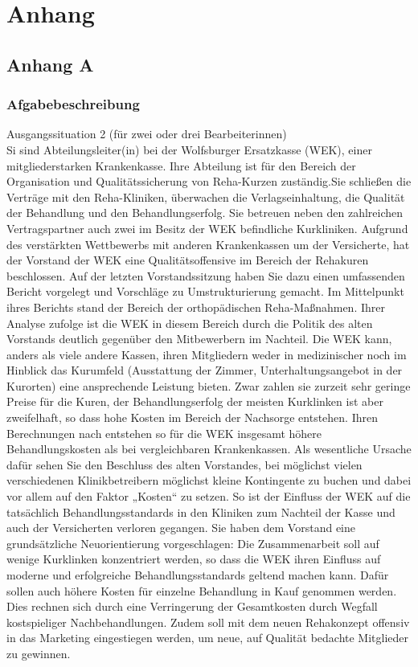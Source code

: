 \chapter{Anhang}
\section{Anhang A}
\subsection{Afgabebeschreibung}
Ausgangssituation 2 (für zwei oder drei Bearbeiterinnen)
\\
Si sind Abteilungsleiter(in) bei der Wolfsburger Ersatzkasse (WEK), einer mitgliederstarken Krankenkasse.
Ihre Abteilung  ist für den Bereich der Organisation und Qualitätssicherung  von Reha-Kurzen zuständig.Sie schließen die Verträge  mit den Reha-Kliniken, überwachen die Verlagseinhaltung, die Qualität  der Behandlung und den Behandlungserfolg. Sie betreuen neben den zahlreichen Vertragspartner auch zwei im Besitz der WEK befindliche Kurkliniken.
Aufgrund des verstärkten Wettbewerbs mit anderen Krankenkassen um der Versicherte, hat der Vorstand der WEK eine Qualitätsoffensive im Bereich der Rehakuren beschlossen. Auf der letzten Vorstandssitzung haben Sie dazu einen umfassenden Bericht  vorgelegt und Vorschläge  zu Umstrukturierung  gemacht. Im Mittelpunkt ihres Berichts stand der Bereich der orthopädischen  Reha-Maßnahmen.
Ihrer Analyse zufolge ist die WEK  in diesem Bereich durch die Politik des alten Vorstands deutlich gegenüber den Mitbewerbern im Nachteil. Die WEK kann, anders als viele andere Kassen, ihren Mitgliedern weder in medizinischer noch im Hinblick das Kurumfeld (Ausstattung der Zimmer, Unterhaltungsangebot in der Kurorten) eine ansprechende Leistung bieten. Zwar zahlen sie zurzeit sehr geringe Preise für die Kuren, der Behandlungserfolg der meisten Kurklinken ist aber zweifelhaft, so dass hohe Kosten im Bereich der Nachsorge entstehen. Ihren Berechnungen nach entstehen  so für die WEK insgesamt höhere Behandlungskosten als bei vergleichbaren Krankenkassen. Als wesentliche Ursache dafür sehen Sie den Beschluss des alten Vorstandes, bei möglichst vielen verschiedenen Klinikbetreibern möglichst kleine Kontingente zu buchen und dabei vor allem auf den Faktor „Kosten“ zu setzen. So ist der Einfluss der WEK auf die tatsächlich Behandlungsstandards in den Kliniken zum Nachteil der Kasse und auch der Versicherten verloren gegangen.
Sie haben dem Vorstand eine grundsätzliche Neuorientierung vorgeschlagen: Die Zusammenarbeit soll auf wenige Kurklinken konzentriert werden, so dass die WEK ihren Einfluss auf moderne und erfolgreiche Behandlungsstandards geltend machen kann. Dafür sollen  auch höhere Kosten für einzelne Behandlung in Kauf genommen werden. Dies rechnen sich durch eine Verringerung der Gesamtkosten durch Wegfall kostspieliger Nachbehandlungen. Zudem soll mit dem neuen Rehakonzept offensiv in das Marketing eingestiegen werden, um neue, auf Qualität bedachte Mitglieder  zu gewinnen.
